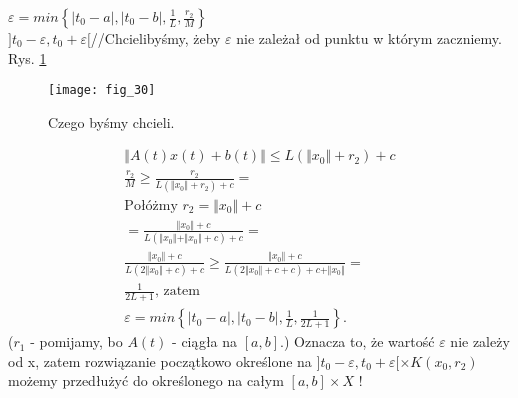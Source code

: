 \documentclass[../main.tex]{subfiles}
\begin{document}
$\varepsilon = min \left\{ |t_0-a|,|t_0-b|,\frac{1}{L},\frac{r_2}{M} \right\} $\\
$]t_0-\varepsilon,t_0+\varepsilon[$//Chcielibyśmy, żeby $\varepsilon$ nie zależał od punktu w którym zaczniemy. Rys. \ref{fig:fig_30}
\begin{figure}
    \centering
    \texttt{[image: fig\_30]}
    \caption{Czego byśmy chcieli.}
    \label{fig:fig_30}
\end{figure}

\begin{align*}
    \Vert  A(t)x(t)+b(t)  \Vert \le L(\Vert x_0\Vert +r_2 ) +c\\
    \frac{r_2}{M} \ge \frac{r_2}{L(\Vert x_0 \Vert +r_2)+c}=\\
    \text{Połóżmy }r_2 = \Vert x_0 \Vert +c\\
    = \frac{\Vert x_0 \Vert +c}{L(\Vert x_0 \Vert +\Vert x_0 \Vert +c)+c}=\\
    \frac{\Vert x_0 \Vert +c}{L(2\Vert x_0 \Vert +c)+c}\ge \frac{\Vert x_0 \Vert +c}{L(2\Vert x_0 \Vert +c+c) + c + \Vert x_0 \Vert } = \\
    \frac{1}{2L+1}\text{, zatem}\\
    \varepsilon = min \left\{ |t_0-a|,|t_0-b|,\frac{1}{L},\frac{1}{2L+1} \right\}
.\end{align*}
($r_1$ - pomijamy, bo $A(t)$ -  ciągła na $[a,b]$.)
Oznacza to, że wartość $\varepsilon$ nie zależy od x, zatem rozwiązanie początkowo określone na
$]t_0-\varepsilon,t_0+\varepsilon[ \times K(x_0,r_2)$ możemy przedłużyć do określonego na całym $[a,b] \times X$ !
\end{document}
